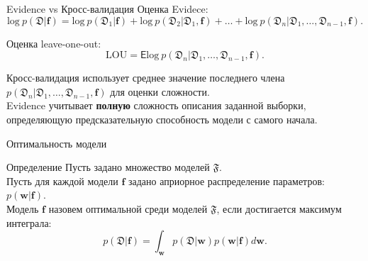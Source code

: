 \documentclass[10pt,pdf,utf8,russian,aspectratio=169]{beamer}
\begin{document}
\begin{frame}{Evidence vs Кросс-валидация}
Оценка Evidece:
\[
\text{log}~p(\mathfrak{D}|\mathbf{f}) = \text{log}~p(\mathfrak{D}_1|\mathbf{f}) + \text{log}~p(\mathfrak{D}_2|\mathfrak{D}_1, \mathbf{f}) + \dots +  \text{log}~p(\mathfrak{D}_n|\mathfrak{D}_1,\dots,\mathfrak{D}_{n-1}, \mathbf{f}).
\]

Оценка leave-one-out:
\[
\text{LOU} = \mathsf{E} \text{log}~p(\mathfrak{D}_n|\mathfrak{D}_1,\dots,\mathfrak{D}_{n-1}, \mathbf{f}).
\]

Кросс-валидация использует среднее значение последнего члена $p(\mathfrak{D}_n|\mathfrak{D}_1,\dots,\mathfrak{D}_{n-1}, \mathbf{f})$ для оценки сложности. \\
Evidence учитывает \textbf{полную} сложность описания заданной выборки, определяющую предсказательную способность модели с самого начала.
\end{frame}


\begin{frame}{Оптимальность модели}
\begin{block}{Определение}
Пусть задано множество моделей $\mathfrak{F}$.  \\
Пусть для каждой модели $\mathbf{f}$ задано априорное распределение параметров: $p(\mathbf{w}|\mathbf{f})$.\\
Модель $\mathbf{f}$ назовем оптимальной среди моделей $\mathfrak{F}$, если достигается максимум интеграла:
\[
	p(\mathfrak{D}|\mathbf{f}) = \int_\mathbf{w} p(\mathfrak{D}|\mathbf{w})p(\mathbf{w}|\mathbf{f}) d\mathbf{w}.
\]
\end{block}
\end{frame}
\end{document}
